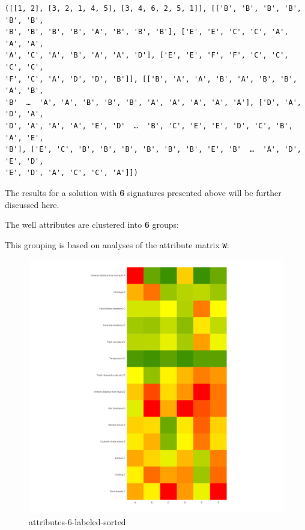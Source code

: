 \documentclass[11pt]{article}
\makeatletter
\newcommand{\boxspacing}{\kern\kvtcb@left@rule\kern\kvtcb@boxsep}
\newcommand{\prompt}[4]{
        {\ttfamily\llap{{\color{#2}[#3]:\hspace{3pt}#4}}\vspace{-\baselineskip}}
    }
\makeatother
\begin{document}
    \begin{Verbatim}[commandchars=\\\{\}]

    \end{Verbatim}

            \begin{tcolorbox}[breakable, size=fbox, boxrule=.5pt, pad at break*=1mm, opacityfill=0]
\prompt{Out}{outcolor}{22}{\boxspacing}
\begin{Verbatim}[commandchars=\\\{\}]
([[1, 2], [3, 2, 1, 4, 5], [3, 4, 6, 2, 5, 1]], [['B', 'B', 'B', 'B', 'B', 'B',
'B', 'B', 'B', 'B', 'A', 'B', 'B', 'B'], ['E', 'E', 'C', 'C', 'A', 'A', 'A',
'A', 'C', 'A', 'B', 'A', 'A', 'D'], ['E', 'E', 'F', 'F', 'C', 'C', 'C', 'C',
'F', 'C', 'A', 'D', 'D', 'B']], [['B', 'A', 'A', 'B', 'A', 'B', 'B', 'A', 'B',
'B'  …  'A', 'A', 'B', 'B', 'B', 'A', 'A', 'A', 'A', 'A'], ['D', 'A', 'D', 'A',
'D', 'A', 'A', 'A', 'E', 'D'  …  'B', 'C', 'E', 'E', 'D', 'C', 'B', 'A', 'E',
'B'], ['E', 'C', 'B', 'B', 'B', 'B', 'B', 'B', 'E', 'B'  …  'A', 'D', 'E', 'D',
'E', 'D', 'A', 'C', 'C', 'A']])
\end{Verbatim}
\end{tcolorbox}
        
    The results for a solution with \textbf{6} signatures presented above
will be further discussed here.

The well attributes are clustered into \textbf{6} groups:

This grouping is based on analyses of the attribute matrix \texttt{W}:

\begin{figure}
\centering
\includegraphics{../figures-set00-v9-inv-750-1000-daln/attributes-6-labeled-sorted.png}
\caption{attributes-6-labeled-sorted}
\end{figure}
\end{document}

